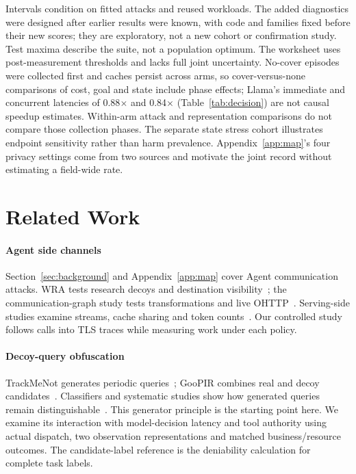 Intervals condition on fitted attacks and reused workloads. The added diagnostics were designed after earlier results were known, with code and families fixed before their new scores; they are exploratory, not a new cohort or confirmation study. Test maxima describe the suite, not a population optimum. The worksheet uses post-measurement thresholds and lacks full joint uncertainty. No-cover episodes were collected first and caches persist across arms, so cover-versus-none comparisons of cost, goal and state include phase effects; Llama's immediate and concurrent latencies of 0.88$\times$ and 0.84$\times$ (Table~\ref{tab:decision}) are not causal speedup estimates. Within-arm attack and representation comparisons do not compare those collection phases. The separate state stress cohort illustrates endpoint sensitivity rather than harm prevalence. Appendix~\ref{app:map}'s four privacy settings come from two sources and motivate the joint record without estimating a field-wide rate.

\section{Related Work}\label{sec:related}
\paragraph{Agent side channels}
Section~\ref{sec:background} and Appendix~\ref{app:map} cover Agent communication attacks. WRA tests research decoys and destination visibility~\cite{jeong2026wra}; the communication-graph study tests transformations and live OHTTP~\cite{dangol2026workflow}. Serving-side studies examine streams, cache sharing and token counts~\cite{weiss2024prompt,whisperleak2025,earlybird2025,timewilltell2024,carlini2024timing,wu2026cacheprune}. Our controlled study follows calls into TLS traces while measuring work under each policy.

\paragraph{Decoy-query obfuscation}
TrackMeNot generates periodic queries~\cite{howe2008trackmenot}; GooPIR combines real and decoy candidates~\cite{domingoferrer2009goopir}. Classifiers and systematic studies show how generated queries remain distinguishable~\cite{peddinti2010trackmenot,balsa2012obpws,gervais2014websearch}. This generator principle is the starting point here. We examine its interaction with model-decision latency and tool authority using actual dispatch, two observation representations and matched business/resource outcomes. The candidate-label reference is the deniability calculation for complete task labels.

